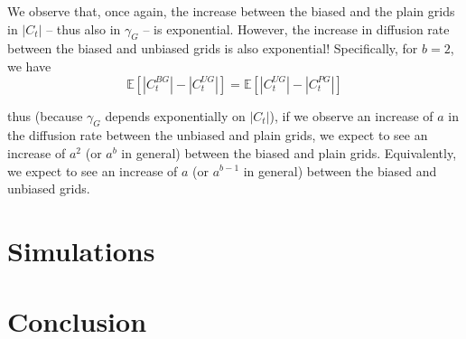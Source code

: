 \documentclass[format=acmsmall, review=false]{acmart}
\begin{document}
\par We observe that, once again, the increase between the biased and the plain grids in $|C_t|$ -- thus also in $\gamma_G$
-- is exponential. However, the increase in diffusion rate between the biased and unbiased grids is also exponential!
Specifically, for $b = 2$, we have
\[
\mathbb{E} \left[ |C^{BG}_t| - |C^{UG}_t| \right] = \mathbb{E} \left[ |C^{UG}_t| - |C^{PG}_t| \right]
\]

thus (because $\gamma_G$ depends exponentially on $|C_t|$), if we observe an increase of $a$ in the diffusion rate between
the unbiased and plain grids, we expect to see an increase of $a^2$ (or $a^b$ in general) between the biased and plain grids.
Equivalently, we expect to see an increase of $a$ (or $a^{b-1}$ in general) between the biased and unbiased grids.


\section{Simulations}

\section{Conclusion}

%	
%	



\end{document}
